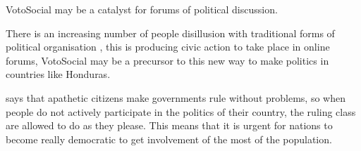 \documentclass[letterpaper,10pt]{article}
\begin{document}
VotoSocial may be a catalyst for forums of political discussion.

There is an increasing number of people disillusion with traditional forms of political organisation \citep{milan2013}, this is producing civic action to take place in online forums, VotoSocial may be a precursor to this new way to make politics in countries like Honduras.

\cite{sartori2003} says that apathetic citizens make governments rule without problems, so when people do not actively participate in the politics of their country, the ruling class are allowed to do as they please. This means that it is urgent for nations to become really democratic to get involvement of the most of the population. 






\end{document}

